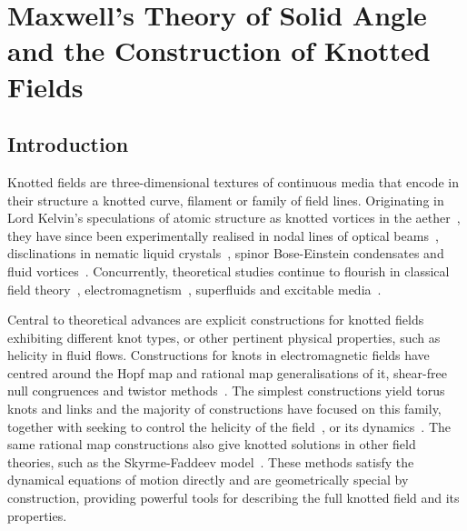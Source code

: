     \chapter{Maxwell's Theory of Solid Angle and the Construction of Knotted Fields}
    \label{ch:Maxwell}
    \section{Introduction}

    Knotted fields are three-dimensional textures of continuous media that encode in their structure a knotted curve, filament or family of field lines. Originating in Lord Kelvin's speculations of atomic structure as knotted vortices in the aether~\citep{Kelvin}, they have since been experimentally realised in nodal lines of optical beams~\citep{Dennis2010}, disclinations in nematic liquid crystals~\citep{Tkalec2011,Tasinkevych2014,Copar2015}, spinor Bose-Einstein condensates and fluid vortices~\citep{Kleckner2013}. Concurrently, theoretical studies continue to flourish in classical field theory~\citep{Sutcliffe2007}, electromagnetism~\citep{Kedia2013,Arrayas2017}, superfluids \citep{Kleckner2016} and excitable media~\citep{Maucher2016,Maucher2017,Maucher2018}.

    Central to theoretical advances are explicit constructions for knotted fields exhibiting different knot types, or other pertinent physical properties, such as helicity in fluid flows. Constructions for knots in electromagnetic fields have centred around the Hopf map and rational map generalisations of it, shear-free null congruences and twistor methods~\citep{Ranada1992,Kedia2013,Arrayas2017,Kedia2018}. The simplest constructions yield torus knots and links and the majority of constructions have focused on this family, together with seeking to control the helicity of the field~\citep{Kedia2018}, or its dynamics~\citep{Irvine2010}. The same rational map constructions also give knotted solutions in other field theories, such as the Skyrme-Faddeev model~\citep{Battye1998,Sutcliffe2007}. These methods satisfy the dynamical equations of motion directly and are geometrically special by construction, providing powerful tools for describing the full knotted field and its properties. 

